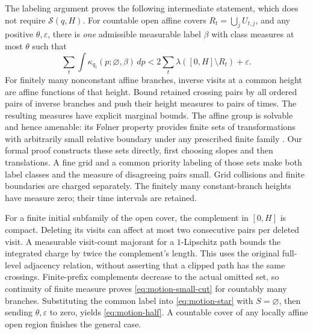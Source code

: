 \begin{proofoutline}
The labeling argument proves the following intermediate statement, which
does not require $\mathcal S(q,H)$.
For countable open affine covers $R_t=\bigcup_j U_{t,j}$, and any positive
$\theta,\varepsilon$, there is \emph{one} admissible measurable label $\beta$
with class measures at most $\theta$ such that
\begin{equation}
\label{eq:motion-small-cut}
 \sum_t\int\kappa_{q_t}(p;\varnothing,\beta)\,dp
 <2\sum_t\lambda([0,H]\setminus R_t)+\varepsilon.
\end{equation}
For finitely many nonconstant affine branches, inverse visits at a common
height are affine functions of that height.  Bound retained crossing pairs
by all ordered pairs of inverse branches and push their height measures to
pairs of times.  The resulting measures have explicit marginal bounds.
The affine group is solvable and hence amenable: its F\o lner property
provides finite sets of transformations with arbitrarily small relative
boundary under any prescribed finite family \cite{Folner1955}.
Our formal proof constructs these sets directly, first choosing slopes and
then translations.  A fine grid and a common priority labeling of those
sets make both label classes and the measure of disagreeing pairs small.
Grid collisions and finite boundaries are charged separately.  The finitely
many constant-branch heights have measure zero; their time intervals are
retained.

For a finite initial subfamily of the open cover, the complement in $[0,H]$
is compact.  Deleting its visits
can affect at most two consecutive pairs per deleted visit.  A measurable
visit-count majorant for a $1$-Lipschitz path bounds the integrated charge by
twice the complement's length.  This uses the original full-level adjacency
relation, without asserting that a clipped path has the same crossings.
Finite-prefix complements decrease to the actual omitted set, so continuity
of finite measure proves \eqref{eq:motion-small-cut} for countably many
branches.  Substituting the common label into \eqref{eq:motion-star} with
$S=\varnothing$, then sending $\theta,\varepsilon$ to zero, yields
\eqref{eq:motion-half}.  A countable cover of any locally affine open region
finishes the general case.
\end{proofoutline}

